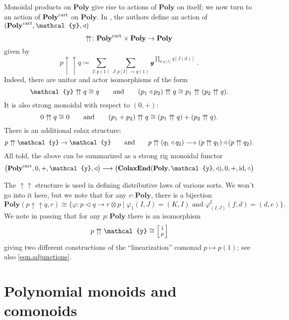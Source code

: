 \documentclass[11pt, one side, article]{memoir}
\makeatletter
\theoremstyle{definition}
\theoremstyle{plain}
\newcommand{\Cat}[1]{\mathbf{#1}}%
\newcommand{\id}{\mathrm{id}}
\newcommand{\too}{\longrightarrow}
\newcommand{\tn}[1]{\textnormal{#1}}
\newcommand{\yon}{{\mathcal{y}}}
\newcommand{\poly}{\Cat{Poly}}
\newcommand{\polycart}{\poly^{\tn{cart}}}
\newcommand{\0}{\textsf{0}}
\newcommand{\1}{\tn{\textsf{1}}}
\newcommand{\tri}{\mathbin{\triangleleft}}
\newcommand{\biglens}[2]{
     \begin{bmatrix}{\vphantom{f_f^f}#2} \\ {\vphantom{f_f^f}#1} \end{bmatrix}
}
\newcommand{\littlelens}[2]{
     \begin{bsmallmatrix}{\vphantom{f}#2} \\ {\vphantom{f}#1} \end{bsmallmatrix}
}
\newcommand{\lens}[2]{
  \relax\if@display
     \biglens{#1}{#2}
  \else
     \littlelens{#1}{#2}
  \fi
}
\newcommand{\upup}{\uparrow\!\uparrow}
\newcommand{\hh}[2][]{#1 \tn{#2} #1}
\newcommand{\qqand}{\hh[\qquad]{and}}
\makeatother
\begin{document}
\bigskip
Monoidal products on $\poly$ give rise to actions of $\poly$ on itself; we now turn to an action of $\polycart$ on $\poly$.
In \cite{aberle2024polynomial}, the authors define an action of $(\polycart,\yon,\tri)$
\begin{equation}
  \upup\colon\polycart\times\poly\to\poly
\end{equation}
given by
\begin{equation}
  p\upup q\coloneqq\sum_{I:p(1)}\sum_{J\colon p[I]\to q(1)}\yon^{\prod_{d:p[I]}q[J(d)]}\;.
\end{equation}
Indeed, there are unitor and actor isomorphisms of the form
\begin{equation}
	\yon\upup q\cong q
	\qqand
	(p_1\tri p_2)\upup q\cong p_1\upup(p_2\upup q).
\end{equation}
It is also strong monoidal with respect to $(0,+)$:
\begin{equation}
	0\upup q\cong 0
	\qqand
	(p_1+p_2)\upup q\cong(p_1\upup q) + (p_2\upup q).
\end{equation}
There is an additional colax structure:
\begin{equation}
	p\upup\yon\to\yon
	\qqand
	p\upup(q_1\tri q_2)\too(p\upup q_1)\tri(p\upup q_2).
\end{equation}
All told, the above can be summarized as a strong rig monoidal functor
\begin{equation}
\big(\polycart,0,+,\yon,\tri\big)\too\big(\Cat{ColaxEnd}(\poly,\yon,\tri),0,+,\id,\circ\big)
\end{equation}


The $\upup$ structure is used in defining distributive laws of various sorts. We won't go into it here, but we note that for any $r:\poly$, there is a bijection
\begin{equation}
\poly(p\upup q,r)\cong\{\varphi\colon p\tri q\to r\otimes p\mid\varphi_1(I,J)=(K,I)\text{ and }\varphi^\sharp_{(I,J)}(f,d)=(d,e)\}.
\end{equation}
We note in passing that for any $p:\poly$ there is an isomorphism
\begin{equation}
p\upup\yon\cong\lens{p}{1}
\end{equation}
giving two different constructions of the ``linearization'' comonad $p\mapsto p(1)$; see also \eqref{eqn.adjunctions}. 

\chapter{Polynomial monoids and comonoids}\label{chap.monoids.comonoids}
\end{document}
